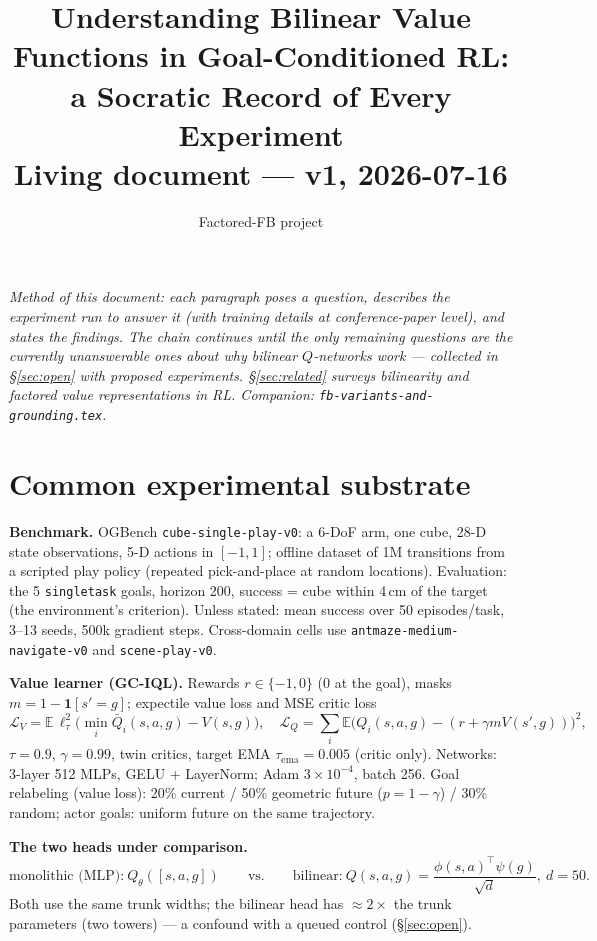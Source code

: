 \documentclass[11pt]{article}
\title{Understanding Bilinear Value Functions in Goal-Conditioned RL:\\
a Socratic Record of Every Experiment\\
\large Living document --- v1, 2026-07-16}
\author{Factored-FB project}
\date{}
\newcommand{\E}{\mathbb{E}}
\begin{document}
\maketitle

\noindent\emph{Method of this document: each paragraph poses a question, describes the
experiment run to answer it (with training details at conference-paper level), and states the
findings. The chain continues until the only remaining questions are the currently
unanswerable ones about why bilinear $Q$-networks work --- collected in
\S\ref{sec:open} with proposed experiments. \S\ref{sec:related} surveys bilinearity and
factored value representations in RL. Companion: \texttt{fb-variants-and-grounding.tex}.}

\section{Common experimental substrate}\label{sec:substrate}

\textbf{Benchmark.} OGBench \texttt{cube-single-play-v0}: a 6-DoF arm, one cube,
28-D state observations, 5-D actions in $[-1,1]$; offline dataset of 1M transitions from a
scripted play policy (repeated pick-and-place at random locations). Evaluation: the 5
\texttt{singletask} goals, horizon 200, success = cube within 4\,cm of the target (the
environment's criterion). Unless stated: mean success over 50 episodes/task, 3--13 seeds,
500k gradient steps. Cross-domain cells use \texttt{antmaze-medium-navigate-v0} and
\texttt{scene-play-v0}.

\textbf{Value learner (GC-IQL).} Rewards $r\in\{-1,0\}$ ($0$ at the goal), masks
$m=1-\mathbf 1[s'{=}g]$; expectile value loss and MSE critic loss
\begin{equation}
\mathcal L_V = \E\,\ell^2_{\tau}\!\big(\min_i \bar Q_i(s,a,g)-V(s,g)\big),\quad
\mathcal L_Q = \sum_i\E\big(Q_i(s,a,g)-(r+\gamma m V(s',g))\big)^2,
\label{eq:iql}
\end{equation}
$\tau{=}0.9$, $\gamma{=}0.99$, twin critics, target EMA $\tau_{\mathrm{ema}}{=}0.005$
(critic only). Networks: 3-layer 512 MLPs, GELU + LayerNorm; Adam $3{\times}10^{-4}$, batch
256. Goal relabeling (value loss): 20\% current / 50\% geometric future ($p{=}1{-}\gamma$) /
30\% random; actor goals: uniform future on the same trajectory.

\textbf{The two heads under comparison.}
\begin{equation}
\text{monolithic (MLP):}\ Q_\theta([s,a,g])\qquad\text{vs.}\qquad
\text{bilinear:}\ Q(s,a,g)=\frac{\phi(s,a)^\top\psi(g)}{\sqrt d},\ d{=}50.
\label{eq:heads}
\end{equation}
Both use the same trunk widths; the bilinear head has $\approx 2\times$ the trunk parameters
(two towers) --- a confound with a queued control (\S\ref{sec:open}).
\end{document}
